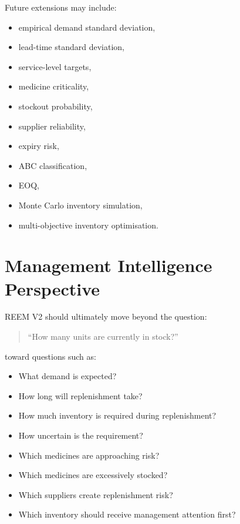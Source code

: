 \documentclass[11pt,a4paper]{article}
\begin{document}
Future extensions may include:

\begin{itemize}
    \item empirical demand standard deviation,
    \item lead-time standard deviation,
    \item service-level targets,
    \item medicine criticality,
    \item stockout probability,
    \item supplier reliability,
    \item expiry risk,
    \item ABC classification,
    \item EOQ,
    \item Monte Carlo inventory simulation,
    \item multi-objective inventory optimisation.
\end{itemize}

\section{Management Intelligence Perspective}

REEM V2 should ultimately move beyond the question:

\begin{quote}
``How many units are currently in stock?''
\end{quote}

toward questions such as:

\begin{itemize}
    \item What demand is expected?
    \item How long will replenishment take?
    \item How much inventory is required during replenishment?
    \item How uncertain is the requirement?
    \item Which medicines are approaching risk?
    \item Which medicines are excessively stocked?
    \item Which suppliers create replenishment risk?
    \item Which inventory should receive management attention first?
\end{itemize}
\end{document}
